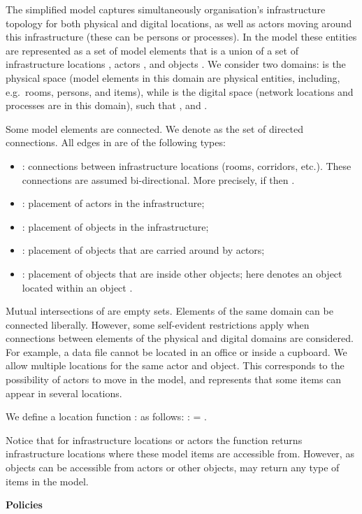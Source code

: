 \documentclass{llncs}
\begin{document}
The simplified model captures simultaneously organisation's infrastructure topology for both physical and digital locations, as well as actors moving around this infrastructure (these can be persons or processes).  In the model these entities are represented as a set of model elements  that is a union of a set of infrastructure locations , actors , and objects . We consider two domains:  is the physical space (model elements in this domain are physical entities, including, e.g.\ rooms, persons, and items), while  is the digital space (network locations and processes are in this domain), such that , and . 


Some model elements are connected. We denote as  the set of directed connections. All edges  in  are of the following types:
\begin{itemize}
\item : connections between infrastructure locations (rooms, corridors, etc.). These connections are assumed bi-directional. More precisely, if  then .
\item : placement of actors in the infrastructure; 	
\item : placement of objects in the infrastructure;
\item : placement of objects that are carried around by actors; 
\item : placement of objects that are inside other objects; here  denotes an object  located within an object .
\end{itemize}
Mutual intersections of  are empty sets. Elements of the same domain can be connected liberally. However, some self-evident restrictions apply when connections between elements of the physical and digital domains are considered. For example, a data file cannot be located in an office or inside a cupboard. We allow multiple locations for the same actor and object. This corresponds to the possibility of actors to move in the model, and represents that some items can appear in several locations. 

We define a location function \loc{}:    as follows: 
 : = .

Notice that for infrastructure locations or actors the function \loc{} returns infrastructure locations where these model items are accessible from. However, as objects can be accessible from actors or other objects, \loc{} may return any type of items in the model. 

\textbf{Policies}
\end{document}
